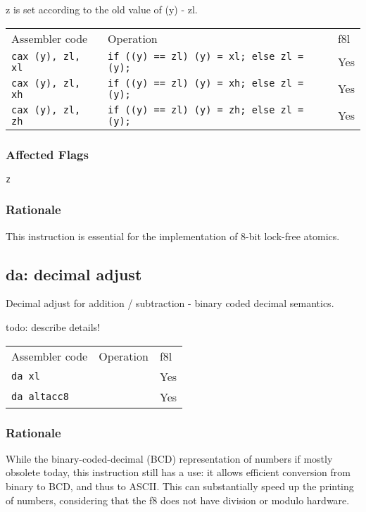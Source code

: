 \documentclass{book}
\begin{document}
z is set according to the old value of (y) - zl.

\begin{tabular}{l l l}
Assembler code            & Operation                                        & f8l \\
\texttt{cax (y), zl, xl}  & \texttt{if ((y) == zl) (y) = xl; else zl = (y);} & Yes \\
\texttt{cax (y), zl, xh}  & \texttt{if ((y) == zl) (y) = xh; else zl = (y);} & Yes \\
\texttt{cax (y), zl, zh}  & \texttt{if ((y) == zl) (y) = zh; else zl = (y);} & Yes
\end{tabular}

\subsubsection*{Affected Flags}

\texttt{z}

\subsubsection*{Rationale}

This instruction is essential for the implementation of 8-bit lock-free atomics.


\subsection{da: decimal adjust}

Decimal adjust for addition / subtraction - binary coded decimal semantics.

todo: describe details!

\begin{tabular}{l l l}
Assembler code      & Operation & f8l \\
\texttt{da xl}      &           & Yes \\
\texttt{da altacc8} &           & Yes \\
\end{tabular}

\subsubsection*{Rationale}

While the binary-coded-decimal (BCD) representation of numbers if mostly obsolete today, this instruction still has a use: it allows efficient conversion from binary to BCD, and thus to ASCII. This can substantially speed up the printing of numbers, considering that the f8 does not have division or modulo hardware.
\end{document}
